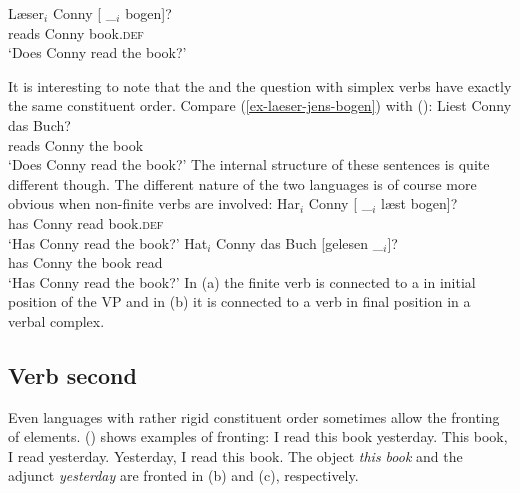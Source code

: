 \ex
\gll Læser$_i$ Conny [ \_$_i$ bogen]?\\
     reads     Conny {}        {}     book.\textsc{def}\\
\glt `Does Conny read the book?'
\zl

It is interesting to note that the  and the  question with simplex verbs have exactly
the same constituent order. Compare (\ref{ex-laeser-jens-bogen}) with ():
\ea
\gll Liest Conny das Buch?\\
     reads Conny the book\\ \german
\glt `Does Conny read the book?'
\z
The internal structure of these sentences is quite different though. The different nature of the two
languages is of course more obvious when non-finite verbs are involved:
\eal
\ex
\gll Har$_i$ Conny [ \_$_i$ læst bogen]?\\
     has Conny {} {} read book.\textsc{def}\\\danish
\glt `Has Conny read the book?'
\ex
\gll Hat$_i$ Conny das Buch [gelesen \_$_i$]?\\
     has Conny the book \spacebr{}read\\ \german
\glt `Has Conny read the book?'
\zl
In (a) the finite verb is connected to a  in initial position of the VP and in
(b) it is connected to a verb in final position in a verbal complex.%


\subsection{Verb second}
\label{sce-verb-second}

Even languages with rather rigid constituent order sometimes allow the fronting of elements.
() shows  examples of fronting:
\eal
\ex I read this book yesterday.
\ex This book, I read yesterday.
\ex Yesterday, I read this book.
\zl
The object \emph{this book} and the adjunct \emph{yesterday} are fronted in (b) and
(c), respectively.

